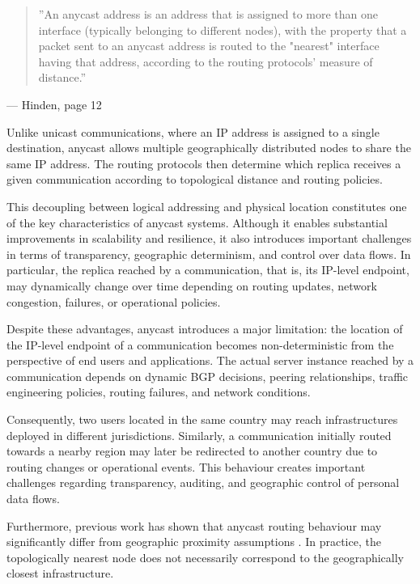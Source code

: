 \begin{quote}
    ''An anycast address is an address that is assigned to more than one interface (typically belonging to different nodes), with the property that a packet sent to an anycast address is routed to the "nearest" interface having that address, according to the routing protocols' measure of distance.''
\end{quote}
\hfill --- Hinden, page 12 \cite{Hinden2003InternetArchitecture}

Unlike unicast communications, where an IP address is assigned to a single destination, anycast allows multiple geographically distributed nodes to share the same IP address. The routing protocols then determine which replica receives a given communication according to topological distance and routing policies.

This decoupling between logical addressing and physical location constitutes one of the key characteristics of anycast systems. Although it enables substantial improvements in scalability and resilience, it also introduces important challenges in terms of transparency, geographic determinism, and control over data flows. In particular, the replica reached by a communication, that is, its IP-level endpoint, may dynamically change over time depending on routing updates, network congestion, failures, or operational policies.

Despite these advantages, anycast introduces a major limitation: the location of the IP-level endpoint of a communication becomes non-deterministic from the perspective of end users and applications. The actual server instance reached by a communication depends on dynamic BGP decisions, peering relationships, traffic engineering policies, routing failures, and network conditions.

Consequently, two users located in the same country may reach infrastructures deployed in different jurisdictions. Similarly, a communication initially routed towards a nearby region may later be redirected to another country due to routing changes or operational events. This behaviour creates important challenges regarding transparency, auditing, and geographic control of personal data flows.

Furthermore, previous work has shown that anycast routing behaviour may significantly differ from geographic proximity assumptions \cite{Bian2019TowardsPeering,Calder2015AnalyzingCDN}. In practice, the topologically nearest node does not necessarily correspond to the geographically closest infrastructure.

